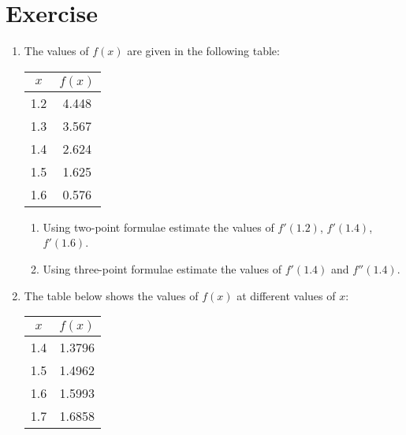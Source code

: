 \documentclass[12pt,class=book,crop=false]{standalone}
\begin{document}
\section{Exercise}
\begin{enumerate}
    \item The values of  $ f(x) $ are given in the following table:
          \begin{table}[H]
              \centering
              \begin{tabular}{cS[table-format=2.3]}
                  \toprule
                  $ x $    &
                   \\   &
                   4.448 \\
                    1.3   &
                    3.567 \\
                     1.4   &
                     2.624 \\
                      1.5   &
                      1.625 \\
                       1.6   &
                            0.576 \\\bottomrule
              \end{tabular}
          \end{table}
          \begin{enumerate}
              \item Using two-point  formulae estimate the values of $ f' (1.2) $, $ f' (1.4) $, $ f' (1.6) $.
              \item  Using three-point formulae estimate the values of $ f' (1.4) $ and $ f''(1.4 ) $.
          \end{enumerate}
    \item The table below shows the values of $ f(x) $ at different values of  $ x $:
          \begin{table}[H]
              \centering
              \begin{tabular}{cS[table-format=2.4]}
                  \toprule
                  $ x $    &
                  \\    &
                   1.3796\\
                    1.5    &
                    1.4962 \\
                     1.6    &
                     1.5993 \\
                     1.7    &
                     1.6858 \\

\end{tabular}
\end{table}
\end{enumerate}
\end{document}
